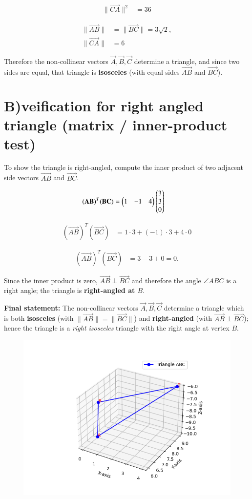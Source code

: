 \documentclass[journal]{IEEEtran}
\begin{document}
\begin{align}
\|\vec{CA}\|^2 &= 36
\end{align}



\begin{align}
\|\vec{AB}\| &= \|\vec{BC}\| = 3\sqrt{2}, \\
\|\vec{CA}\| &= 6
\end{align}

Therefore the non-collinear vectors $\vec{A},\vec{B},\vec{C}$ determine a triangle, and since two sides are equal, that triangle is \textbf{isosceles} (with equal sides $\vec{AB}$ and $\vec{BC}$).

\section*{B)veification for right angled triangle (matrix / inner-product test)}
To show the triangle is right-angled, compute the inner product of two adjacent side vectors $\vec{AB}$ and $\vec{BC}$.

\begin{align}
(\mathbf{AB})^T(\mathbf{BC}) &= \begin{pmatrix}1&-1&4\end{pmatrix}\begin{pmatrix}3\\3\\0\end{pmatrix}
\end{align}

\begin{align}
(\vec{AB})^T(\vec{BC}) &= 1\cdot 3 + (-1)\cdot 3 + 4\cdot 0
\end{align}

\begin{align}
(\vec{AB})^T(\vec{BC}) &= 3 - 3 + 0 = 0.
\end{align}

Since the inner product is zero, $\vec{AB}\perp\vec{BC}$ and therefore the angle $\angle ABC$ is a right angle; the triangle is \textbf{right-angled at $B$}.



\noindent\textbf{Final statement:} The non-collinear vectors $\vec{A},\vec{B},\vec{C}$ determine a triangle which is both \textbf{isosceles} (with $\|\vec{AB}\|=\|\vec{BC}\|$) and \textbf{right-angled} (with $\vec{AB}\perp\vec{BC}$); hence the triangle is a \emph{right isosceles} triangle with the right angle at vertex $B$.

\begin{figure}[H]
    \centering
    \includegraphics[width=0.9\columnwidth]{figs/fig1.png}
    \caption{}
    \label{fig:}
\end{figure}
\end{document}
